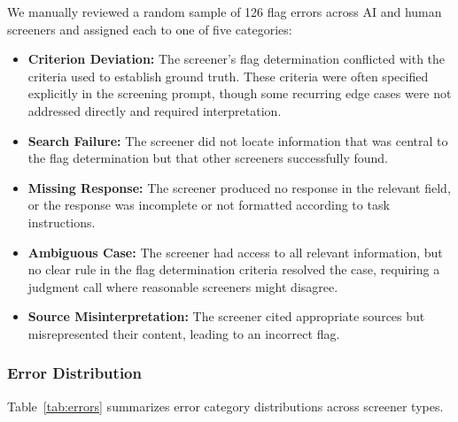 \documentclass[utf8]{FrontiersinHarvard}
\begin{document}
We manually reviewed a random sample of 126 flag errors across AI and human screeners and assigned each to one of five categories:

\begin{itemize}
\item \textbf{Criterion Deviation:} The screener's flag determination conflicted with the criteria used to establish ground truth. These criteria were often specified explicitly in the screening prompt, though some recurring edge cases were not addressed directly and required interpretation.
\item \textbf{Search Failure:} The screener did not locate information that was central to the flag determination but that other screeners successfully found.
\item \textbf{Missing Response:} The screener produced no response in the relevant field, or the response was incomplete or not formatted according to task instructions.
\item \textbf{Ambiguous Case:} The screener had access to all relevant information, but no clear rule in the flag determination criteria resolved the case, requiring a judgment call where reasonable screeners might disagree.
\item \textbf{Source Misinterpretation:} The screener cited appropriate sources but misrepresented their content, leading to an incorrect flag.
\end{itemize}

\subsubsection{Error Distribution}

Table~\ref{tab:errors} summarizes error category distributions across screener types.
\end{document}

